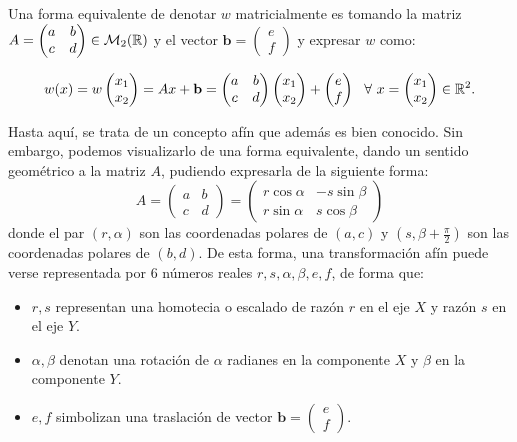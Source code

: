 Una forma equivalente de denotar $w$ matricialmente es tomando la matriz $A=\begin{pmatrix}
    a & b \\
    c & d
\end{pmatrix}\in\mathcal{M}_2(\mathbb{R})$ y el vector $\mathbf b=\begin{pmatrix}
    e \\
    f
\end{pmatrix}$ y expresar $w$ como:

\begin{equation}
    w(x) =
    w\begin{pmatrix}
        x_1 \\
        x_2
    \end{pmatrix} = Ax + \mathbf b = \begin{pmatrix}
        a & b \\
        c & d
    \end{pmatrix}\begin{pmatrix}
        x_1 \\
        x_2
    \end{pmatrix}+\begin{pmatrix}
        e \\
        f
    \end{pmatrix} \ \ \forall \ x = \begin{pmatrix}
        x_1 \\
        x_2
    \end{pmatrix}\in\mathbb{R}^2.
\end{equation}

Hasta aquí, se trata de un concepto afín que además es bien conocido. Sin embargo, podemos visualizarlo de una forma equivalente, dando un sentido geométrico a la matriz $A$, pudiendo expresarla de la siguiente forma:
\begin{equation}
    A = \begin{pmatrix}
        a & b \\
        c & d
    \end{pmatrix} = \begin{pmatrix}
        r\cos\alpha & -s\sin\beta \\
        r\sin\alpha & s\cos\beta
    \end{pmatrix}
\end{equation}
donde el par $(r,\alpha)$ son las coordenadas polares de $(a,c)$ y $(s,\beta+\frac \pi 2)$ son las coordenadas polares de $(b,d)$. De esta forma, una transformación afín puede verse representada por 6 números reales $r,s,\alpha,\beta,e,f$, de forma que:
\begin{itemize}
    \item $r,s$ representan una homotecia o escalado de razón $r$ en el eje $X$ y razón $s$ en el eje $Y$.
    \item $\alpha,\beta$ denotan una rotación de $\alpha$ radianes en la componente $X$ y $\beta$ en la componente $Y$.
    \item $e,f$ simbolizan una traslación de vector $\mathbf b=\begin{pmatrix} e \\ f\end{pmatrix}$.
\end{itemize}

